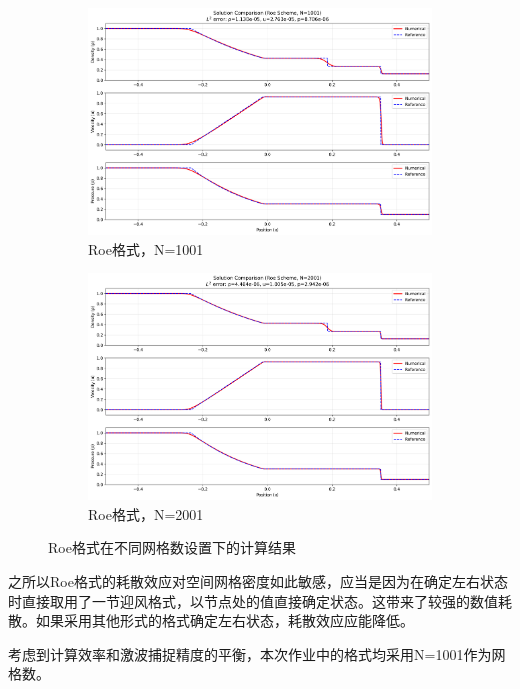 \documentclass[12pt, a4paper]{article}
\begin{document}
\begin{figure}[htbp]
\begin{subfigure}[b]{0.45\textwidth}
        \includegraphics[width=\textwidth]{./pictures/Solution Comparison (Roe Scheme, N=1001).png} 
        \caption{Roe格式，N=1001}
    \end{subfigure}
    \hfill
    \begin{subfigure}[b]{0.45\textwidth} 
        \centering
        \includegraphics[width=\textwidth]{./pictures/Solution Comparison (Roe Scheme, N=2001).png} 
        \caption{Roe格式，N=2001}
    \end{subfigure}
    \caption{Roe格式在不同网格数设置下的计算结果}
\end{figure}

之所以Roe格式的耗散效应对空间网格密度如此敏感，应当是因为在确定左右状态时直接取用了一节迎风格式，以节点处的值直接确定状态。这带来了较强的数值耗散。如果采用其他形式的格式确定左右状态，耗散效应应能降低。

考虑到计算效率和激波捕捉精度的平衡，本次作业中的格式均采用N=1001作为网格数。
\end{document}
